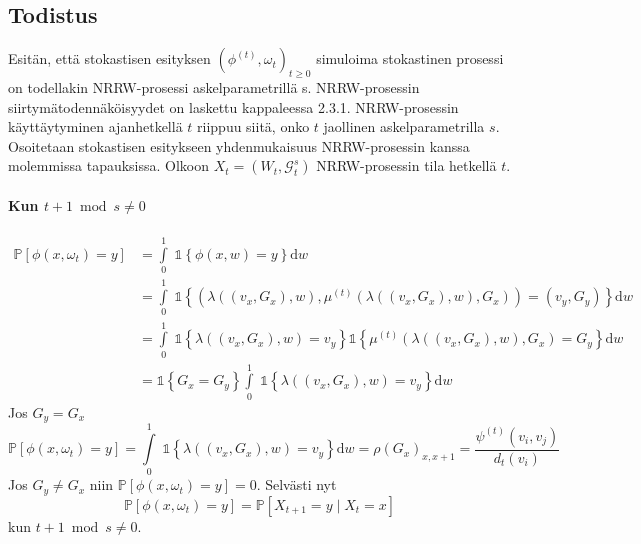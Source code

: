 \documentclass[finnish, 12pt, a4paper, sci, utf8, pdfa]{aaltothesis}
\newcommand{\indicator}{\mathopen{\mathds{1}}}
\newcommand*{\prob}{\mathbb{P}}
\begin{document}
\subsection{Todistus}

Esitän, että stokastisen esityksen \( (\phi^{(t)}, \omega_{t})_{t \geq 0} \) simuloima stokastinen prosessi on todellakin NRRW-prosessi askelparametrillä s. NRRW-prosessin siirtymätodennäköisyydet on laskettu kappaleessa 2.3.1. NRRW-prosessin käyttäytyminen ajanhetkellä $ t $ riippuu siitä, onko $ t $ jaollinen askelparametrilla $ s $. Osoitetaan stokastisen esitykseen yhdenmukaisuus NRRW-prosessin kanssa molemmissa tapauksissa. Olkoon $ X_{t} = (W_{t}, \mathcal{G}^{s}_{t}) $ NRRW-prosessin tila hetkellä $ t $.

\paragraph{Kun $ t + 1 \bmod s \neq 0 $}

\begin{align*}
   \prob \left[ \phi(x, \omega_{t}) = y \right] &= \int\limits_0^1 \; \indicator \left\{ \phi(x, w) = y \right\} \mathrm{d}w \\
                                                &= \int\limits_0^1 \; \indicator \left\{ \left( \lambda\left( (v_{x}, G_{x}), w \right), \mu^{(t)} \left( \lambda\left( (v_{x}, G_{x}), w \right), G_{x} \right) \right) = (v_{y}, G_{y}) \right\} \mathrm{d}w \\
                                                &= \int\limits_0^1 \; \indicator \left\{ \lambda\left( (v_{x}, G_{x}), w \right) = v_{y} \right\} \indicator \left\{ \mu^{(t)} \left( \lambda\left( (v_{x}, G_{x}), w \right), G_{x} \right) = G_{y} \right\} \mathrm{d}w \\
                                                &= \indicator \left\{ G_{x} = G_{y} \right\} \int\limits_0^1 \; \indicator \left\{ \lambda\left( (v_{x}, G_{x}), w \right) = v_{y} \right\} \mathrm{d}w
\end{align*}
Jos $ G_{y} = G_{x} $
\[
   \prob \left[ \phi(x, \omega_{t}) = y \right] = \int\limits_0^1 \; \indicator \left\{ \lambda\left( (v_{x}, G_{x}), w \right) = v_{y} \right\} \mathrm{d}w = \rho(G_{x})_{x,x+1} = \frac{\psi^{(t)}(v_{i}, v_{j})}{d_{t}(v_{i})}
\]
Jos $ G_{y} \neq G_{x} $ niin $ \prob \left[ \phi(x, \omega_{t}) = y \right] = 0 $. Selvästi nyt
\[
   \prob \left[ \phi(x, \omega_{t}) = y \right] = \prob \left[ X_{t+1} = y \mid X_{t} = x \right]
\]
kun $ t + 1 \bmod s \neq 0 $.
\end{document}
